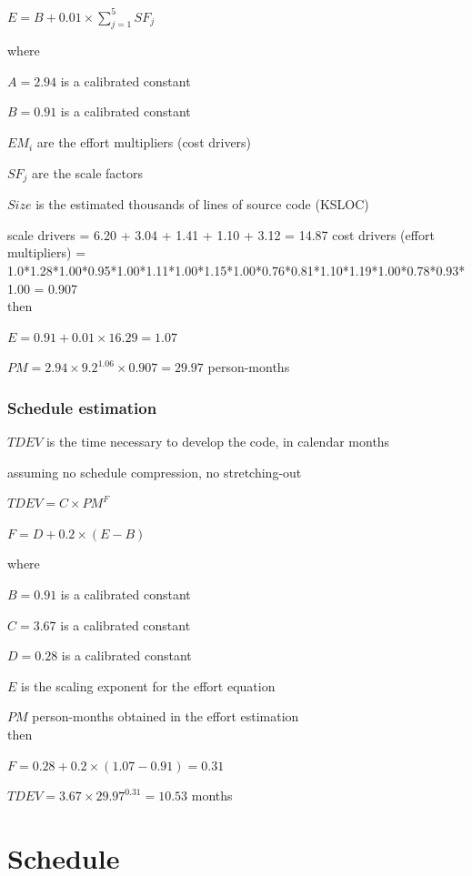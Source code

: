 \documentclass[english]{article}
\begin{document}
\begin{center}
$ E = B + 0.01 \times \sum_{j=1}^{5} SF_j $
\end{center}
where

$ A = 2.94 $ is a calibrated constant 

$ B = 0.91 $ is a calibrated constant

$EM_i$ are the effort multipliers (cost drivers)

$SF_j$ are the scale factors

$Size$ is the estimated thousands of lines of source code (KSLOC)


scale drivers = 6.20 + 3.04 + 1.41 + 1.10 + 3.12 = 14.87
cost drivers (effort multipliers) = 1.0*1.28*1.00*0.95*1.00*1.11*1.00*1.15*1.00*0.76*0.81*1.10*1.19*1.00*0.78*0.93*1.00 = 0.907\\
then

$E = 0.91 + 0.01 \times 16.29 = 1.07$

$PM = 2.94 \times 9.2^{1.06} \times 0.907 = 29.97$ person-months

\subsubsection{Schedule estimation}

$TDEV$ is the time necessary to develop the code, in calendar months

assuming no schedule compression, no stretching-out

\begin{center}
	$TDEV = C \times PM^F$
\end{center}

\begin{center}
	$F = D + 0.2 \times (E-B)$
\end{center}
where

$B = 0.91$ is a calibrated constant

$C = 3.67$ is a calibrated constant

$D = 0.28$ is a calibrated constant

$E$ is the scaling exponent for the effort equation

$PM$ person-months obtained in the effort estimation\\
then

$F = 0.28 + 0.2 \times (1.07 - 0.91) = 0.31$

$TDEV = 3.67 \times 29.97^{0.31} = 10.53$ months

\section{Schedule}
\end{document}
